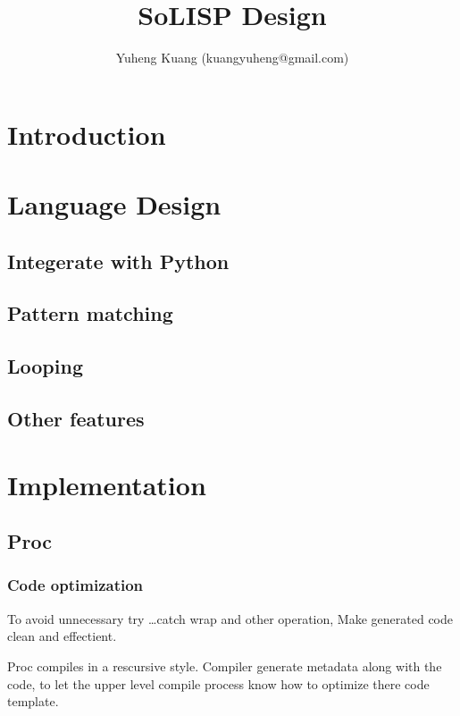 \documentclass[a4paper,11pt]{article}
\title{SoLISP Design}
\author{Yuheng Kuang (kuangyuheng@gmail.com)}
\begin{document}
\maketitle

\section{Introduction}


\section{Language Design}

\subsection{Integerate with Python}


\subsection{Pattern matching}


\subsection{Looping}


\subsection{Other features}



\section{Implementation}

\subsection{Proc}

\subsubsection{Code optimization}

To avoid unnecessary try \ldots catch wrap and other operation, Make generated code clean and effectient.

Proc compiles in a rescursive style. Compiler generate metadata along with the code, to let the upper level compile process know how to optimize there code template.
\end{document}

